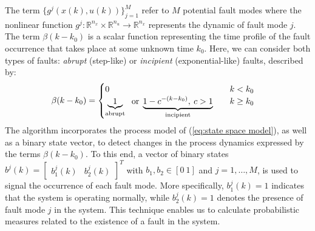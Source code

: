 \documentclass[10pt,twocolumn,twoside]{IEEEtran}
\begin{document}
The term $\{g^{j}\left(x\left(k\right),u\left(k\right)\right)\}_{j=1}^{M}$
refer to $M$ potential fault modes where the nonlinear function $g^{j}:\mathbb{R}^{n_{x}}\times\mathbb{R}^{n_{u}}\rightarrow\mathbb{R}^{n_{x}}$
represents the dynamic of fault mode $j$. The term $\beta(k-k_{0})$
is a scalar function representing the time profi{}le of the fault
occurrence that takes place at some unknown time $k_{0}$. Here, we
can consider both types of faults: \emph{abrupt} (step-like) or \emph{incipient}
(exponential-like) faults, described by:
\begin{equation}
\begin{aligned}\beta(k-k_{0}) & =\begin{cases}
0 & \quad k<k_{0}\\
\underbrace{1}_{\text{abrupt}}\text{\;\ or}\;\underbrace{1-c^{-\left(k-k_{0}\right)},\: c>1}_{\text{incipient}} & \quad k\ge k_{0}
\end{cases}\end{aligned}
\label{eq:scalar function}
\end{equation}
The algorithm incorporates the process model of (\ref{eq:state space model}),
as well as a binary state vector, to detect changes in the process
dynamics expressed by the terms $\beta(k-k_{0})$. To this end, a
vector of binary states $b^{j}\left(k\right)=[\begin{array}{cc}
b_{1}^{j}\left(k\right) & b_{2}^{j}\left(k\right)\end{array}]^{T}$ with $b_{1},b_{2}\in\left[0\:1\right]$ and $j=1,\ldots,M$, is used
to signal the occurrence of each fault mode. More specifically, $b_{1}^{j}\left(k\right)=1$
indicates that the system is operating normally, while $b_{2}^{j}\left(k\right)=1$
denotes the presence of fault mode $j$ in the system. This technique
enables us to calculate probabilistic measures related to the existence
of a fault in the system. 
\end{document}
